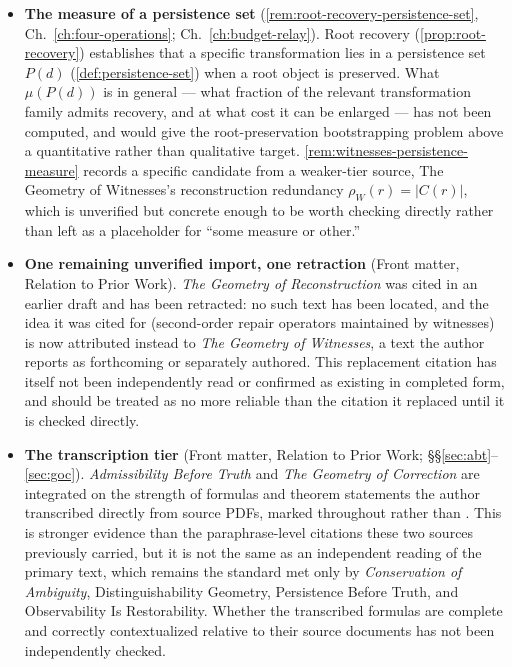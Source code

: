 \begin{itemize}
  \item \textbf{The measure of a persistence set}
  (\cref{rem:root-recovery-persistence-set}, Ch.~\ref{ch:four-operations};
  Ch.~\ref{ch:budget-relay}). Root recovery (\cref{prop:root-recovery})
  establishes that a specific transformation lies in a persistence set
  $P(d)$ (\cref{def:persistence-set}) when a root object is preserved. What
  $\mu(P(d))$ is in general --- what fraction of the relevant transformation
  family admits recovery, and at what cost it can be enlarged --- has not
  been computed, and would give the root-preservation bootstrapping problem
  above a quantitative rather than qualitative target.
  \cref{rem:witnesses-persistence-measure} records a specific candidate
  from a weaker-tier source, The Geometry of Witnesses's reconstruction
  redundancy $\rho_W(r) = |C(r)|$, which is unverified but concrete enough
  to be worth checking directly rather than left as a placeholder for
  ``some measure or other.''

  \item \textbf{One remaining unverified import, one retraction}
  (Front matter, Relation to Prior Work). \emph{The Geometry of
  Reconstruction} was cited in an earlier draft and has been retracted: no
  such text has been located, and the idea it was cited for (second-order
  repair operators maintained by witnesses) is now attributed instead to
  \emph{The Geometry of Witnesses}, a text the author reports as
  forthcoming or separately authored. This replacement citation has
  itself not been independently read or confirmed as existing in completed
  form, and should be treated as no more reliable than the citation it
  replaced until it is checked directly.

  \item \textbf{The transcription tier} (Front matter, Relation to Prior
  Work; \S\S\ref{sec:abt}--\ref{sec:goc}). \emph{Admissibility Before
  Truth} and \emph{The Geometry of Correction} are integrated on the
  strength of formulas and theorem statements the author transcribed
  directly from source PDFs, marked \transcribed{} throughout rather than
  \imported{}. This is stronger evidence than the paraphrase-level
  citations these two sources previously carried, but it is not the same
  as an independent reading of the primary text, which remains the
  standard met only by \emph{Conservation of Ambiguity}, Distinguishability
  Geometry, Persistence Before Truth, and Observability Is Restorability.
  Whether the transcribed formulas are complete and correctly contextualized
  relative to their source documents has not been independently checked.


\end{itemize}
